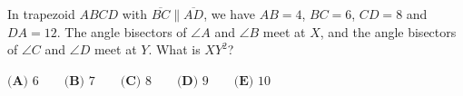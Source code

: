In trapezoid $ABCD$ with $\overline{BC}\parallel\overline{AD}$, we have $AB=4$, $BC=6$, $CD=8$ and $DA=12$. The angle bisectors of $\angle A$ and $\angle B$ meet at $X$, and the angle bisectors of $\angle C$ and $\angle D$ meet at $Y$. What is $XY^2$?

$\textbf{(A) }6\qquad\textbf{(B) }7\qquad\textbf{(C) }8\qquad\textbf{(D) }9\qquad\textbf{(E) }10$
